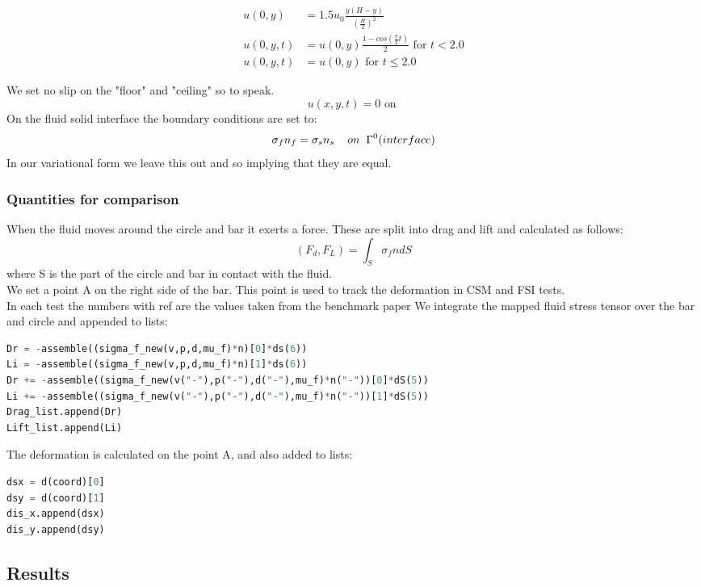 \begin{align*}
u(0,y) &= 1.5u_0 \frac{y(H-y)}{(\frac{H}{2})^2}  \\
u(0,y,t) &= u(0,y)\frac{1-cos(\frac{\pi}{2}t)}{2} \text{  for  } t<2.0 \\
u(0,y,t) &= u(0,y) \text{  for  } t \leq 2.0
\end{align*}

We set no slip on the "floor" and "ceiling" so to speak.\\
$$ u(x,y,t) = 0 \text{  on  }  $$
On the fluid solid interface the boundary conditions are set to:
$$  \sigma_f n_f = \sigma_s n_s \hspace{4mm} on  \hspace{2mm}\Gamma^0 (interface)   $$
In our variational form we leave this out and so implying that they are equal.

\subsubsection*{Quantities for comparison}
When the fluid moves around the circle and bar it exerts a force. These are split into drag and lift and calculated as follows:
$$ (F_d, F_L) = \int_S \sigma_f n dS $$ 
where S is the part of the circle and bar in contact with the fluid. \\
We set a point A on the right side of the bar. This point is used to track the deformation in CSM and FSI tests. \\
In each test the numbers with ref are the values taken from the benchmark paper \cite{Hron2006a}
We integrate the mapped fluid stress tensor over the bar and circle and appended to lists: 
\begin{lstlisting}[language=Python]
Dr = -assemble((sigma_f_new(v,p,d,mu_f)*n)[0]*ds(6))
Li = -assemble((sigma_f_new(v,p,d,mu_f)*n)[1]*ds(6))
Dr += -assemble((sigma_f_new(v("-"),p("-"),d("-"),mu_f)*n("-"))[0]*dS(5))
Li += -assemble((sigma_f_new(v("-"),p("-"),d("-"),mu_f)*n("-"))[1]*dS(5))
Drag_list.append(Dr)
Lift_list.append(Li)
\end{lstlisting}
The deformation is calculated on the point A, and also added to lists:
\begin{lstlisting}[language=Python]
dsx = d(coord)[0]
dsy = d(coord)[1]
dis_x.append(dsx)
dis_y.append(dsy)
\end{lstlisting}
\subsection{Results}
